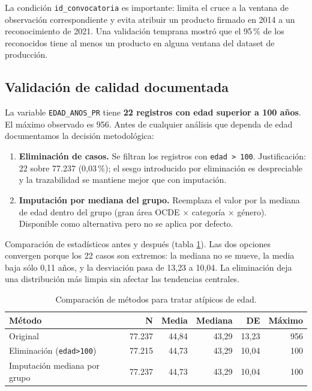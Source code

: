 \documentclass[11pt,a4paper,oneside]{article}
\begin{document}
\noindent La condición \texttt{id\_convocatoria} es importante: limita el cruce a la ventana de observación correspondiente y evita atribuir un producto firmado en 2014 a un reconocimiento de 2021. Una validación temprana mostró que el 95\,\% de los reconocidos tiene al menos un producto en alguna ventana del dataset de producción.

\subsection{Validación de calidad documentada}\label{ssec:val-calidad}

La variable \texttt{EDAD\_ANOS\_PR} tiene \textbf{22 registros con edad superior a 100 años}. El máximo observado es 956. Antes de cualquier análisis que dependa de edad documentamos la decisión metodológica:

\begin{enumerate}[label=(\alph*),leftmargin=*]
\item \textbf{Eliminación de casos.} Se filtran los registros con \texttt{edad > 100}. Justificación: 22 sobre 77.237 (0,03\,\%); el sesgo introducido por eliminación es despreciable y la trazabilidad se mantiene mejor que con imputación.
\item \textbf{Imputación por mediana del grupo.} Reemplaza el valor por la mediana de edad dentro del grupo (gran área OCDE × categoría × género). Disponible como alternativa pero no se aplica por defecto.
\end{enumerate}

Comparación de estadísticos antes y después (tabla \ref{tab:edad-comp}). Las dos opciones convergen porque los 22 casos son extremos: la mediana no se mueve, la media baja sólo 0{,}11 años, y la desviación pasa de 13{,}23 a 10{,}04. La eliminación deja una distribución más limpia sin afectar las tendencias centrales.

\begin{table}[h]
\centering
\caption{Comparación de métodos para tratar atípicos de edad.}
\label{tab:edad-comp}
\small
\begin{tabular}{l r r r r r}
\toprule
\textbf{Método} & \textbf{N} & \textbf{Media} & \textbf{Mediana} & \textbf{DE} & \textbf{Máximo} \\
\midrule
Original                       & 77.237 & 44{,}84 & 43{,}29 & 13{,}23 & 956 \\
Eliminación (\texttt{edad>100}) & 77.215 & 44{,}73 & 43{,}29 & 10{,}04 & 100 \\
Imputación mediana por grupo   & 77.237 & 44{,}73 & 43{,}29 & 10{,}04 & 100 \\
\bottomrule
\end{tabular}
\end{table}
\end{document}

